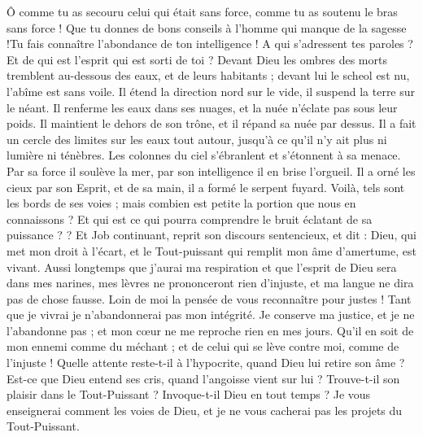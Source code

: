 \begin{multicols}{2}
{Ô comme tu as secouru celui qui était sans force, comme tu as soutenu le bras sans force !
Que tu donnes de bons conseils à l'homme qui manque de la sagesse !Tu fais connaître l'abondance de ton intelligence !
A qui s'adressent tes paroles ? Et de qui est l'esprit qui est sorti de toi ?
Devant Dieu les ombres des morts tremblent au-dessous des eaux, et de leurs habitants ;
devant lui le scheol est nu, l'abîme est sans voile.
Il étend la direction nord sur le vide, il suspend la terre sur le néant.
Il renferme les eaux dans ses nuages, et la nuée n'éclate pas sous leur poids.
Il maintient le dehors de son trône, et il répand sa nuée par dessus.
Il a fait un cercle des limites sur les eaux tout autour, jusqu'à ce qu'il n'y ait plus ni lumière ni ténèbres.
Les colonnes du ciel s'ébranlent et s'étonnent à sa menace.
Par sa force il soulève la mer, par son intelligence il en brise l'orgueil.
Il a orné les cieux par son Esprit, et  de sa main, il a formé le serpent fuyard.
Voilà, tels sont les bords de ses voies ; mais combien est petite la portion que nous en connaissons ? Et qui est ce qui pourra comprendre le bruit éclatant de sa puissance ? ?
\VerseOne{}Et Job continuant, reprit son discours sentencieux, et dit :
Dieu, qui met mon droit à l'écart, et le Tout-puissant qui remplit mon âme d'amertume, est vivant.
Aussi longtemps que j'aurai ma respiration et que l'esprit de Dieu sera dans mes narines,
mes lèvres ne prononceront rien d'injuste, et ma langue ne dira pas de chose fausse.
Loin de moi la pensée de vous reconnaître pour justes ! Tant que je vivrai je n'abandonnerai pas mon intégrité.
Je conserve ma justice, et je ne l'abandonne pas ; et mon cœur ne me reproche rien en mes jours.
Qu'il en soit de mon ennemi comme du méchant ; et de celui qui se lève contre moi, comme de l'injuste !
Quelle attente reste-t-il à l'hypocrite, quand Dieu lui retire son âme ?
Est-ce que Dieu entend ses cris, quand l'angoisse vient sur lui ?
Trouve-t-il son plaisir dans le Tout-Puissant ? Invoque-t-il Dieu en tout temps ?
Je vous enseignerai comment les voies de Dieu, et je ne vous cacherai pas les projets du Tout-Puissant.
}
\end{multicols}

